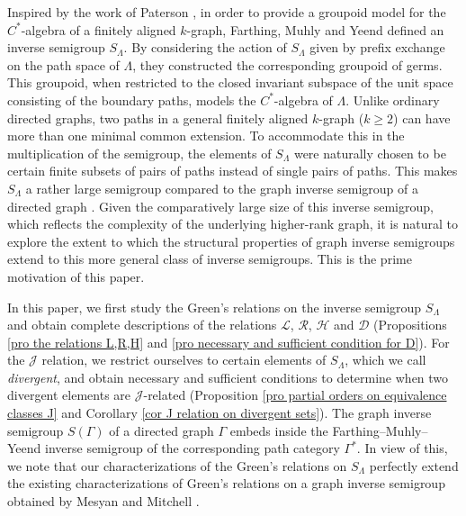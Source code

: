 \documentclass[a4paper,reqno,11pt]{amsart}
\numberwithin{equation}{section}
\theoremstyle{definition}
\theoremstyle{remark}
\begin{document}
Inspired by the work of Paterson \cite{Paterson}, in order to provide a groupoid model for the $C^*$-algebra of a finitely aligned $k$-graph, Farthing, Muhly and Yeend \cite{Farthing} defined an inverse semigroup $S_\Lambda$. By considering the action of $S_\Lambda$ given by prefix exchange on the path space of $\Lambda$, they constructed the corresponding groupoid of germs. This groupoid, when restricted to the closed invariant subspace of the unit space consisting of the boundary paths, models the $C^*$-algebra of $\Lambda$. Unlike ordinary directed graphs, two paths in a general finitely aligned $k$-graph ($k\ge 2$) can have more than one minimal common extension. To accommodate this in the multiplication of the semigroup, the elements of $S_\Lambda$ were naturally chosen to be certain finite subsets of pairs of paths instead of single pairs of paths. This makes $S_\Lambda$ a rather large semigroup compared to the graph inverse semigroup of a directed graph \cite{Ash-Hall, Lawson, Meakin-Wang, Mesyan, Paterson}. Given the comparatively large size of this inverse semigroup, which reflects the complexity of the underlying higher-rank graph, it is natural to explore the extent to which the structural properties of graph inverse semigroups extend to this more general class of inverse semigroups. This is the prime motivation of this paper. 

In this paper, we first study the Green's relations on the inverse semigroup $S_\Lambda$ and obtain complete descriptions of the relations $\mathscr{L}$, $\mathscr{R}$, $\mathscr{H}$ and $\mathscr{D}$ (Propositions \ref{pro the relations L,R,H} and \ref{pro necessary and sufficient condition for D}). For the $\mathscr{J}$ relation, we restrict ourselves to certain elements of $S_\Lambda$, which we call \emph{divergent}, and obtain necessary and sufficient conditions to determine when two divergent elements are $\mathscr{J}$-related (Proposition \ref{pro partial orders on equivalence classes J} and Corollary \ref{cor J relation on divergent sets}). The graph inverse semigroup $S(\Gamma)$ of a directed graph $\Gamma$ embeds inside the Farthing--Muhly--Yeend inverse semigroup of the corresponding path category $\Gamma^*$. In view of this, we note that our characterizations of the Green's relations on $S_\Lambda$ perfectly extend the existing characterizations of Green's relations on a graph inverse semigroup obtained by Mesyan and Mitchell \cite{Mesyan}.
\end{document}
